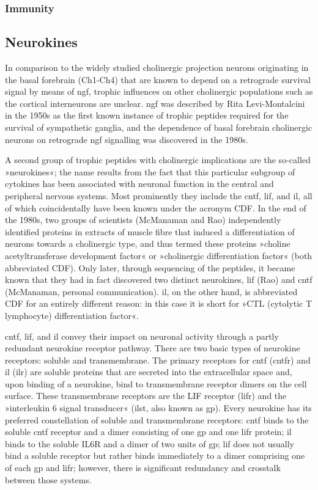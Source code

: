 \subsubsection{Immunity}

\subsection{Neurokines}
In comparison to the widely studied cholinergic projection neurons originating in the basal forebrain (Ch1-Ch4) that are known to depend on a retrograde survival signal by means of \ac{ngf}, trophic influences on other cholinergic populations such as the cortical interneurons are unclear.  \ac{ngf} was described by Rita Levi-Montalcini in the 1950s as the first known instance of trophic peptides required for the survival of sympathetic ganglia\cite{Levi-Montalcini1960}, and the dependence of basal forebrain cholinergic neurons on retrograde \ac{ngf} signalling was discovered in the 1980s\cite{Hefti1986}.

A second group of trophic peptides with cholinergic implications are the so-called »neurokines«; the name results from the fact that this particular subgroup of cytokines has been associated with neuronal function in the central and peripheral nervous systems. Most prominently they include the \ac{cntf}, \ac{lif}, and \ac{il}, all of which coincidentally have been known under the acronym CDF. In the end of the 1980s, two groups of scientists (McManaman\cite{McManaman1988} and Rao\cite{Rao1992}) independently identified proteins in extracts of muscle fibre that induced a differentiation of neurons towards a cholinergic type, and thus termed these proteins »choline acetyltransferase development factor« or »cholinergic differentiation factor« (both abbreviated CDF). Only later, through sequencing of the peptides, it became known that they had in fact discovered two distinct neurokines, \ac{lif} (Rao) and \ac{cntf} (McManaman, personal communication). \ac{il}, on the other hand, is abbreviated CDF for an entirely different reason: in this case it is short for »CTL (cytolytic T lymphocyte) differentiation factor«.

\ac{cntf}, \ac{lif}, and \ac{il} convey their impact on neuronal activity through a partly redundant neurokine receptor pathway. There are two basic types of neurokine receptors: soluble and transmembrane. The primary receptors for \ac{cntf} (\acs{cntfr}) and \ac{il} (\acs{ilr}) are soluble proteins that are secreted into the extracellular space and, upon binding of a neurokine, bind to transmembrane receptor dimers on the cell surface. These transmembrane receptors are the LIF receptor (\acs{lifr}) and the »interleukin 6 signal transducer« (\acs{ilst}, also known as \acs{gp}). Every neurokine has its preferred constellation of soluble and transmembrane receptors: \ac{cntf} binds to the soluble \ac{cntf} receptor and a dimer consisting of one \ac{gp} and one \ac{lifr} protein; \ac{il} binds to the soluble IL6R and a dimer of two units of \ac{gp}; \ac{lif} does not usually bind a soluble receptor but rather binds immediately to a dimer comprising one of each \ac{gp} and \ac{lifr}; however, there is significant redundancy and crosstalk between those systems\cite{Rawlings2004,Nathanson2012}.

